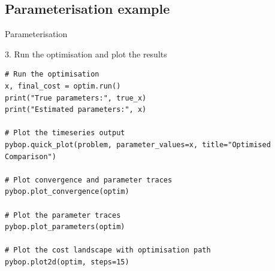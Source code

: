 \documentclass[aspectratio=169]{beamer} %
\begin{document}
\subsection{Parameterisation example}
\begin{frame}[fragile,t]{Parameterisation}
    \vspace{-1.5cm}
    \begin{block}{3. Run the optimisation and plot the results}
    \begin{lstlisting}[firstnumber=1, xleftmargin=10pt]
# Run the optimisation
x, final_cost = optim.run()
print("True parameters:", true_x)
print("Estimated parameters:", x)

# Plot the timeseries output
pybop.quick_plot(problem, parameter_values=x, title="Optimised Comparison")

# Plot convergence and parameter traces
pybop.plot_convergence(optim)

# Plot the parameter traces
pybop.plot_parameters(optim)

# Plot the cost landscape with optimisation path
pybop.plot2d(optim, steps=15)
    \end{lstlisting}
    \end{block}
\end{frame}
\end{document}
